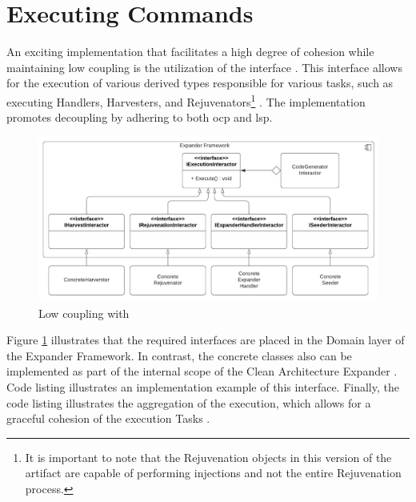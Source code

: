 \section{Executing Commands} \label{subsec_IExecutionInteractorObject}

An exciting implementation that facilitates a high degree of cohesion while maintaining
low coupling is the utilization of the  interface
\parencite{koks_iexecutioninteractor_2023}. This interface allows for the execution of
various derived types responsible for various tasks, such as executing Handlers,
Harvesters, and Rejuvenators\footnote{It is important to note that the Rejuvenation
objects in this version of the artifact are capable of performing injections and not the
entire Rejuvenation process.} \parencites{koks_expandentitieshandlerinteractor_2023,
koks_regionharvesterinteractor_2023, koks_regionrejuvenatorinteractor_2023}. The
implementation promotes decoupling by adhering to both \gls{ocp} and \gls{lsp}.

\begin{figure}[H]
    \centering
    \includegraphics[width=1\textwidth]{figures/command_pattern.pdf}
    \caption[Low coupling with ]{Low coupling with }
    \label{fig_iexecutioninteractor}
  \end{figure}


Figure \ref{fig_iexecutioninteractor} illustrates that the required interfaces are placed
in the Domain layer of the Expander Framework. In contrast, the concrete classes also can
be implemented as part of the internal scope of the Clean Architecture Expander
\parencite{koks_migrationharvesterinteractor_2023}. Code listing
 illustrates an implementation example of
this interface. Finally, the code listing 
illustrates the aggregation of the execution, which allows for a graceful cohesion of the
execution Tasks \parencite{koks_codegeneratorinteractor_2023}.

